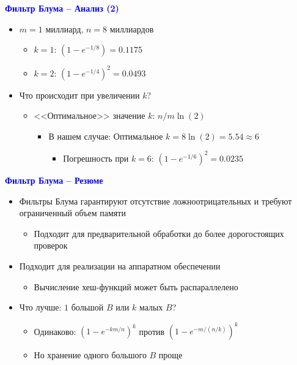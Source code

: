 \documentclass[landscape]{slides}
\begin{document}
\begin{normalsize}
\begin{slide}
\textbf{\textcolor{blue}{Фильтр Блума -- Анализ (2)}}

\begin{itemize}
\item $m=1$ миллиард, $n=8$ миллиардов
  \begin{itemize}
  \item $k=1$: $(1-e^{-1/8}) = 0.1175$
  \item $k=2$: $(1-e^{-1/4})^2 = 0.0493$
  \end{itemize}
\item Что происходит при увеличении $k$?
  \begin{itemize}
  \item <<Оптимальное>> значение $k$: $n/m\ln(2)$
    \begin{itemize}
    \item В нашем случае: Оптимальное $k=8\ln(2) = 5.54\approx 6$
      \begin{itemize}
      \item Погрешность при $k=6$: $(1-e^{-1/6})^2 = 0.0235$
      \end{itemize}
    \end{itemize}
  \end{itemize}
\end{itemize}
\end{slide}

\begin{slide}
\textbf{\textcolor{blue}{Фильтр Блума -- Резюме}}

\begin{itemize}
\item Фильтры Блума гарантируют отсутствие ложноотрицательных и требуют ограниченный объем памяти
  \begin{itemize}
  \item Подходит для предварительной обработки до более дорогостоящих проверок
  \end{itemize}
\item Подходит для реализации на аппаратном обеспечении
  \begin{itemize}
  \item Вычисление хеш-функций может быть распараллелено
  \end{itemize}
\item Что лучше: $1$ большой $B$ или $k$ малых $B$?
  \begin{itemize}
  \item Одинаково: $(1-e^{-km/n})^k$ против $(1-e^{-m/(n/k)})^k$
  \item Но хранение одного большого $B$ проще
  \end{itemize}
\end{itemize}
\end{slide}


\end{normalsize}
\end{document}
